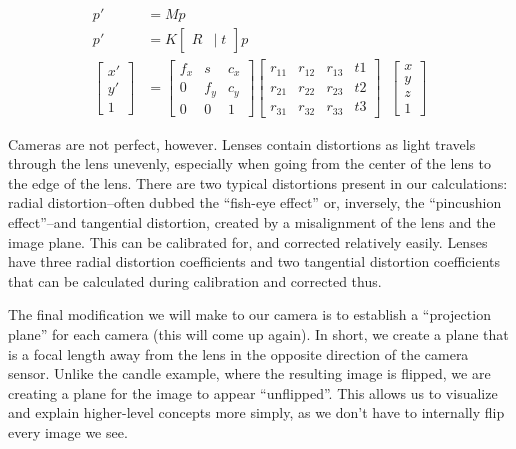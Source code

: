 \documentclass[
    12pt,
    twoside,
    bibstyle=chicago,
    headerstyle=uppercase,
	bibfile=thesis.bib
]{reedthesis}
\newcommand{\RT}{\begin{bmatrix}R &|\; t\end{bmatrix}}
\begin{document}
\begin{align*}
p' &= Mp\\
p' &= K\RT p\\
\begin{bmatrix}x' \\ y' \\ 1\end{bmatrix} &= \begin{bmatrix}f_x & s & c_x \\ 0 & f_y & c_y \\ 0 & 0 & 1\end{bmatrix} \begin{bmatrix} r_{11}&r_{12}&r_{13}&t{1}\\r_{21}&r_{22}&r_{23}&t{2}\\r_{31}&r_{32}&r_{33}&t{3}\end{bmatrix}\;\;\begin{bmatrix}x \\ y \\ z \\ 1\end{bmatrix} 
\end{align*}

Cameras are not perfect, however. Lenses contain distortions as light travels through the lens unevenly, especially when going from the center of the lens to the edge of the lens. There are two typical distortions present in our calculations: radial distortion--often dubbed the “fish-eye effect” or, inversely, the “pincushion effect”--and tangential distortion, created by a misalignment of the lens and the image plane. This can be calibrated for, and corrected relatively easily. Lenses have three radial distortion coefficients and two tangential distortion coefficients that can be calculated during calibration and corrected thus.


The final modification we will make to our camera is to establish a “projection plane” for each camera (this will come up again). In short, we create a plane that is a focal length away from the lens in the opposite direction of the camera sensor. Unlike the candle example, where the resulting image is flipped, we are creating a plane for the image to appear “unflipped”. This allows us to visualize and explain higher-level concepts more simply, as we don't have to internally flip every image we see.
\end{document}
